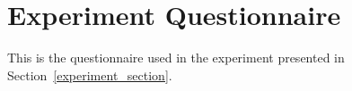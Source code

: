 \chapter{Experiment Questionnaire \label{Experiment_pdf}}

This is the questionnaire used in the experiment presented in Section~\ref{experiment_section}.


